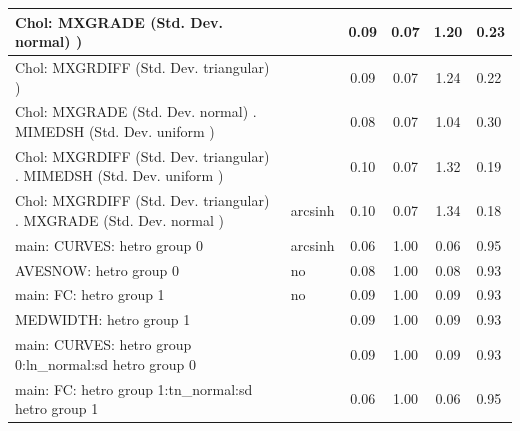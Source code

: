 \begin{table}
\begin{center}
\begin{tabular}{|l|l|c|c|c|l|}
			 Chol: MXGRADE (Std. Dev. normal) ) &  & 0.09 & 0.07 & 1.20 & 0.23 \\
			\hline
			 Chol: MXGRDIFF (Std. Dev. triangular) ) &  & 0.09 & 0.07 & 1.24 & 0.22 \\
			\hline
			 Chol: MXGRADE (Std. Dev. normal) . MIMEDSH (Std. Dev.   uniform ) &  & 0.08 & 0.07 & 1.04 & 0.30 \\
			\hline
			 Chol: MXGRDIFF (Std. Dev. triangular) . MIMEDSH (Std. Dev.   uniform ) &  & 0.10 & 0.07 & 1.32 & 0.19 \\
			\hline
			 Chol: MXGRDIFF (Std. Dev. triangular) . MXGRADE (Std. Dev.   normal ) & arcsinh & 0.10 & 0.07 & 1.34 & 0.18 \\
			\hline
			main: CURVES: hetro group 0 & arcsinh & 0.06 & 1.00 & 0.06 & 0.95 \\
			\hline
			AVESNOW: hetro group 0 & no & 0.08 & 1.00 & 0.08 & 0.93 \\
			\hline
			main: FC: hetro group 1 & no & 0.09 & 1.00 & 0.09 & 0.93 \\
			\hline
			MEDWIDTH: hetro group 1 &  & 0.09 & 1.00 & 0.09 & 0.93 \\
			\hline
			main: CURVES: hetro group 0:ln_normal:sd  hetro group 0 &  & 0.09 & 1.00 & 0.09 & 0.93 \\
			\hline
			main: FC: hetro group 1:tn_normal:sd  hetro group 1 &  & 0.06 & 1.00 & 0.06 & 0.95 \\
			\hline
		\end{tabular}
	\end{center}
\end{table}